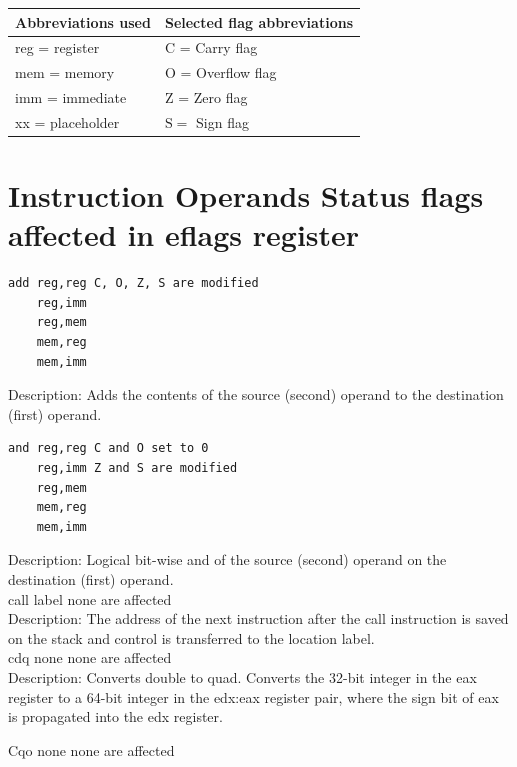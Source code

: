 \documentclass[10pt]{article}
\begin{document}
\begin{center}
\begin{tabular}{|l|l|}
\hline
Abbreviations used & Selected flag abbreviations \\
\hline
reg = register & C = Carry flag \\
\hline
mem = memory & O = Overflow flag \\
\hline
imm = immediate & Z = Zero flag \\
\hline
xx = placeholder & $\mathrm{S}=$ Sign flag \\
\hline
\end{tabular}
\end{center}

\section*{Instruction Operands Status flags affected in eflags register}
\begin{verbatim}
add reg,reg C, O, Z, S are modified
    reg,imm
    reg,mem
    mem,reg
    mem,imm
\end{verbatim}

Description: Adds the contents of the source (second) operand to the destination (first) operand.

\begin{verbatim}
and reg,reg C and O set to 0
    reg,imm Z and S are modified
    reg,mem
    mem,reg
    mem,imm
\end{verbatim}

Description: Logical bit-wise and of the source (second) operand on the destination (first) operand.\\
call label none are affected\\
Description: The address of the next instruction after the call instruction is saved on the stack and control is transferred to the location label.\\
cdq none none are affected\\
Description: Converts double to quad. Converts the 32-bit integer in the eax register to a 64-bit integer in the edx:eax register pair, where the sign bit of eax is propagated into the edx register.

Cqo none none are affected
\end{document}
